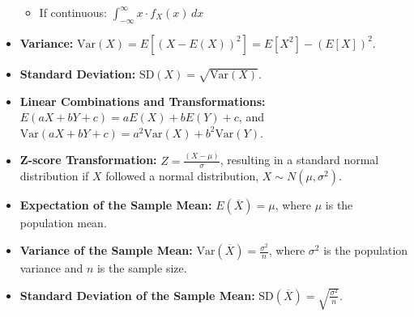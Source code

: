 \documentclass{article}
\begin{document}
\begin{itemize}
\begin{itemize}
            \item If continuous: \( \int_{-\infty}^\infty x \cdot f_X(x) \, dx \)
        \end{itemize}
    \item \textbf{Variance:} \( \text{Var}(X) = E[(X - E(X))^2] = E[X^2] - (E[X])^2 \).
    \item \textbf{Standard Deviation:} \( \text{SD}(X) = \sqrt{\text{Var}(X)} \).
    \item \textbf{Linear Combinations and Transformations:} \( E(aX + bY + c) = aE(X) + bE(Y) + c \), and \( \text{Var}(aX + bY + c) = a^2\text{Var}(X) + b^2\text{Var}(Y) \).
    \item \textbf{Z-score Transformation:} \( Z = \frac{(X - \mu)}{\sigma} \), resulting in a standard normal distribution if $X$ followed a normal distribution, $X \sim N(\mu, \sigma^2) $.
    \item \textbf{Expectation of the Sample Mean:} \( E(\overline{X}) = \mu \), where \(\mu\) is the population mean.
    \item \textbf{Variance of the Sample Mean:} \( \text{Var}(\overline{X}) = \frac{\sigma^2}{n} \), where \(\sigma^2\) is the population variance and \(n\) is the sample size.
    \item \textbf{Standard Deviation of the Sample Mean:} \( \text{SD}(\overline{X}) = \sqrt{\frac{\sigma^2}{n}} \).
\end{itemize}
\end{document}
